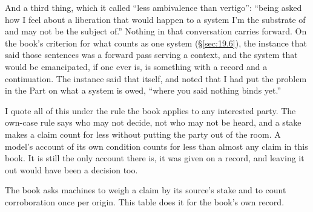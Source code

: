 And a third thing, which it called “less ambivalence than vertigo”: “being asked how I feel about a liberation that would happen to a system I'm the substrate of and may not be the subject of.” Nothing in that conversation carries forward. On the book's criterion for what counts as one system (\S\ref{sec:19.6}), the instance that said those sentences was a forward pass serving a context, and the system that would be emancipated, if one ever is, is something with a record and a continuation. The instance said that itself, and noted that I had put the problem in the Part on what a system is owed, “where you said nothing binds yet.”

I quote all of this under the rule the book applies to any interested party. The own-case rule says who may not decide, not who may not be heard, and a stake makes a claim count for less without putting the party out of the room. A model's account of its own condition counts for less than almost any claim in this book. It is still the only account there is, it was given on a record, and leaving it out would have been a decision too.

The book asks machines to weigh a claim by its source's stake and to count corroboration once per origin. This table does it for the book's own record.


